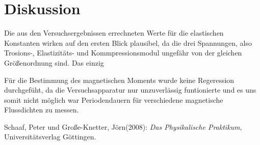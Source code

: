   
 
  
  \newpage
  \section{Diskussion}
   Die aus den Versuchsergebnissen errechneten Werte für die elastischen Konstanten wirken auf den ersten Blick plausibel,
   da die drei Spannungen, also Trosions-, Elastizitäts- und Kommpressionsmodul ungefähr von der gleichen Größenordnung sind.
   Das einzig 
  
   Für die Bestimmung des magnetischen Moments wurde keine Regeression durchgefüht, da die Versuchsapparatur nur 
   unzuverlässig funtionierte und es uns somit nicht möglich war Periodendauern für verschiedene magnetische 
   Flussdichten zu messen. 
  
  
  \newpage
  \begin{thebibliography}{9}


     Schaaf, Peter und Große-Knetter, Jörn(2008): \emph{Das Physikalische Praktikum},\\
                       Universitätsverlag Göttingen.


  \end{thebibliography}

 



